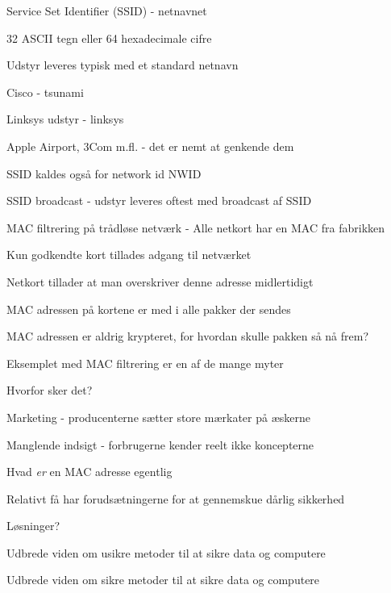 \documentclass[Screen16to9,17pt]{foils}
\begin{document}
\begin{list1}
\item Service Set Identifier (SSID) - netnavnet
\item 32 ASCII tegn eller 64 hexadecimale cifre
\item Udstyr leveres typisk med et standard netnavn
\begin{list2}
\item Cisco - tsunami
\item Linksys udstyr - linksys
\item Apple Airport, 3Com m.fl. - det er nemt at genkende dem
\end{list2}
\item SSID kaldes også for  network id NWID
\item SSID broadcast - udstyr leveres oftest med broadcast af SSID
\end{list1}




\begin{list1}
\item MAC filtrering på trådløse netværk - Alle netkort har en MAC fra fabrikken
\item Kun godkendte kort tillades adgang til netværket
\item Netkort tillader at man overskriver denne adresse midlertidigt
\item MAC adressen på kortene er med i alle pakker der sendes
\item MAC adressen er aldrig krypteret, for hvordan skulle pakken så
  nå frem?
\end{list1}



\begin{list1}
\item Eksemplet med MAC filtrering er en af de mange myter
\item Hvorfor sker det?
\begin{list2}
\item Marketing - producenterne sætter store mærkater på æskerne
\item Manglende indsigt - forbrugerne kender reelt ikke koncepterne
\item Hvad \emph{er} en MAC adresse egentlig
\item Relativt få har forudsætningerne for at gennemskue dårlig sikkerhed
\end{list2}
\item Løsninger?
\pause
\begin{list2}
\item Udbrede viden om usikre metoder til at sikre data og computere
\item Udbrede viden om sikre metoder til at sikre data og computere
\end{list2}
\end{list1}
\end{document}
